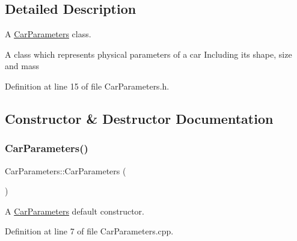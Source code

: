 \subsection{Detailed Description}
A \hyperlink{classCarParameters}{Car\+Parameters} class. 

A class which represents physical parameters of a car Including its shape, size and mass 

Definition at line 15 of file Car\+Parameters.\+h.



\subsection{Constructor \& Destructor Documentation}
\mbox{\label{classCarParameters_a188ab05105e5d379744f2fec14d51650}} 
\subsubsection{\texorpdfstring{Car\+Parameters()}{CarParameters()}\hspace{0.1cm}{\footnotesize\ttfamily [1/3]}}
{\footnotesize\ttfamily Car\+Parameters\+::\+Car\+Parameters (\begin{DoxyParamCaption}{ }\end{DoxyParamCaption})}



A \hyperlink{classCarParameters}{Car\+Parameters} default constructor. 



Definition at line 7 of file Car\+Parameters.\+cpp.


